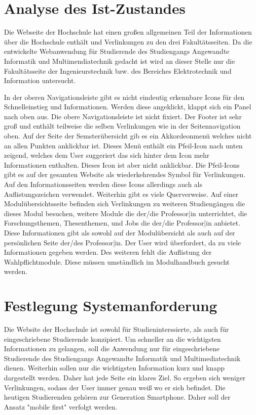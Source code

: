 \documentclass[12pt,					%
							 oneside,			%
							 a4paper,			%
							 halfparskip,		%
							 liststotoc,			%
							 bibtotoc,			%
							 fleqn,				%
							 pointlessnumbers]	%
							 {scrreprt}
\begin{document}
		\section{Analyse des Ist-Zustandes}
		Die Webseite der Hochschule hat einen großen allgemeinen Teil der Informationen über die Hochschule enthält und Verlinkungen zu den drei Fakultätsseiten. Da die entwickelte Webanwendung für Studierende des Studiengangs Angewandte Informatik und Multimendiatechnik gedacht ist wird an dieser Stelle nur die Fakultätsseite der Ingenieurstechnik bzw. des Bereiches Elektrotechnik und Information untersucht.
		
		In der oberen Navigationsleiste gibt es nicht eindeutig erkennbare Icons für den Schnelleinstieg und Informationen. Werden diese angeklickt, klappt sich ein Panel nach oben aus. Die obere Navigationsleiste ist nicht fixiert. Der Footer ist sehr groß und enthält teilweise die selben Verlinkungen wie in der Seitennavigation oben. Auf der Seite der Semsterübersicht gib es ein Akkordeonmenü welches nicht an allen Punkten anklickbar ist. Dieses Menü enthält ein Pfeil-Icon nach unten zeigend, welches dem User suggeriert das sich hinter dem Icon mehr Informationen enthalten.  Dieses Icon ist aber nicht anklickbar. Die Pfeil-Icons gibt es auf der gesamten Website als wiederkehrendes Symbol für Verlinkungen. Auf den Informationsseiten werden diese Icons allerdings auch als Auflistungszeichen verwendet. Weiterhin gibt es viele Querverweise. Auf einer Modulübersichtsseite befinden sich Verlinkungen zu weiteren Studiengängen die dieses Modul besuchen, weitere Module die der/die Professor|in unterrichtet, die Forschungsthemen, Thesenthemen, und Jobs die der/die Professor|in anbietet. Diese Informationen gibt als sowohl auf der Modulübersicht als auch auf der persönlichen Seite der/des Professor|in. Der User wird überfordert, da zu viele Informationen gegeben werden. Des weiteren fehlt die Auflistung der Wahlpflichtmodule. Diese müssen umständlich im Modulhandbuch gesucht werden. 

		\section{Festlegung Systemanforderung}
		Die Website der Hochschule ist sowohl für Studieninterssierte, als auch für eingeschriebene Studierende konzipiert. Um schneller an die wichtigsten Informationen zu gelangen, soll die Anwendung nur für eingeschriebene Studierende des Studiengangs Angewandte Informatik und Multimediatechnik dienen. Weiterhin sollen nur die wichtigsten Information kurz und knapp dargestellt werden. Daher hat jede Seite ein klares Ziel.	So ergeben sich weniger Verlinkungen, sodass der User immer genau weiß wo er sich befindet. Die heutigen Studierenden gehören zur Generation Smartphone. Daher soll der Ansatz "mobile first" verfolgt werden.
	
\end{document}
